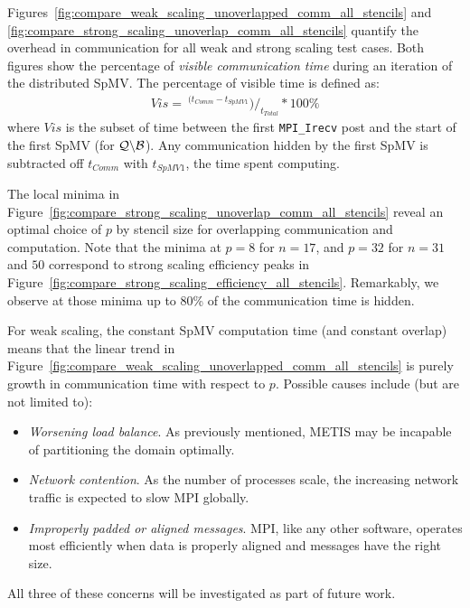 \documentclass{report}
\begin{document}
Figures~\ref{fig:compare_weak_scaling_unoverlapped_comm_all_stencils} and \ref{fig:compare_strong_scaling_unoverlap_comm_all_stencils}  quantify the overhead in communication for all weak and strong scaling test cases. Both figures show the percentage of \emph{visible communication time} during an iteration of the distributed SpMV. The percentage of visible time is defined as: 
\begin{align*}
Vis = \ ^{(t_{Comm} - t_{SpMV 1}}) /_{t_{Total}} * 100\%
\end{align*}
where $Vis$ is the subset of time between the first \texttt{MPI\_Irecv} post and the start of the first SpMV (for $\mathcal{Q} \backslash \mathcal{B}$). Any communication hidden by the first SpMV is subtracted off $t_{Comm}$ with $t_{SpMV 1}$, the time spent computing.

The local minima in  Figure~\ref{fig:compare_strong_scaling_unoverlap_comm_all_stencils} reveal an optimal choice of $p$ by stencil size for overlapping communication and computation. Note that the minima at $p=8$ for $n=17$, and $p=32$ for $n=31$ and $50$ correspond to strong scaling efficiency peaks in Figure~\ref{fig:compare_strong_scaling_efficiency_all_stencils}. Remarkably, we observe at those minima up to 80\% of the communication time is hidden. 

 For weak scaling, the constant SpMV computation time (and constant overlap) means that the linear trend in Figure~\ref{fig:compare_weak_scaling_unoverlapped_comm_all_stencils}  is purely growth in communication time with respect to $p$. Possible causes include (but are not limited to): 
\begin{itemize}
\item \emph{Worsening load balance}. As previously mentioned, METIS may be incapable of partitioning the domain optimally.
\item \emph{Network contention}. As the number of processes scale, the increasing network traffic is expected to slow MPI globally.  
\item \emph{Improperly padded or aligned messages}. MPI, like any other software, operates most efficiently when data is properly aligned and messages have the right size. 
\end{itemize}
All three of these concerns will be investigated as part of future work. 

%
\end{document}
